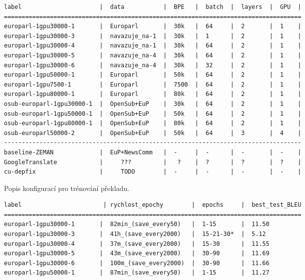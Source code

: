 \documentclass[a4]{article}
\begin{document}
\begin{table}[htpb]
\begin{verbatim}
label                      |  data           |  BPE   |  batch  |  layers  |  GPU  |  
====================================================================================
europarl-1gpu30000-1       |  Europarl       |  30k   |  64     |  2       |  1    |  
europarl-1gpu30000-3       |  navazuje_na-1  |  30k   |  1      |  2       |  1    |  
europarl-1gpu30000-4       |  navazuje_na-1  |  30k   |  64     |  2       |  1    |  
europarl-1gpu30000-5       |  navazuje_na-4  |  30k   |  64     |  2       |  1    |  
europarl-1gpu30000-6       |  navazuje_na-4  |  30k   |  32     |  2       |  1    |  
europarl-1gpu50000-1       |  Europarl       |  50k   |  64     |  2       |  1    |  
europarl-1gpu7500-1        |  Europarl       |  7500  |  64     |  2       |  1    |  
europarl-1gpu80000-1       |  Europarl       |  80k   |  64     |  2       |  1    |  
osub-europarl-1gpu30000-1  |  OpenSub+EuP    |  30k   |  64     |  2       |  1    |  
osub-europarl-1gpu50000-1  |  OpenSub+EuP    |  50k   |  64     |  2       |  1    |  
osub-europarl-1gpu80000-1  |  OpenSub+EuP    |  80k   |  64     |  2       |  1    |  
osub-europarl50000-2       |  OpenSub+EuP    |  50k   |  64     |  3       |  4    |  
------------------------------------------------------------------------------------
baseline-ZEMAN             |  EuP+NewsComm   |  -     |  -      |  -       |  -    |
GoogleTranslate            |     ???         |   ?    |  ?      |  ?       |  ?    |
cu-depfix                  |     TODO        |  -     |  -      |  -       |  -    |
\end{verbatim}
\caption{Popis konfigurací pro trénování překladu.}
\label{tab:config}
%
%
%
%
\begin{verbatim}
label                       | rychlost_epochy        |  epochs     |  best_test_BLEU
====================================================================================
europarl-1gpu30000-1       |  82min_(save_every50)   |  1-15       |  11.50
europarl-1gpu30000-3       |  41h_(save_every2000)   |  15-21-30*  |  5.12
europarl-1gpu30000-4       |  37m_(save_every2000)   |  15-30      |  11.55
europarl-1gpu30000-5       |  43m_(save_every2000)   |  30-90      |  11.69
europarl-1gpu30000-6       |  100m_(save_every2000)  |  30-90      |  11.66
europarl-1gpu50000-1       |  87min_(save_every50)   |  1-15       |  11.27

\end{verbatim}
\end{table}
\end{document}
